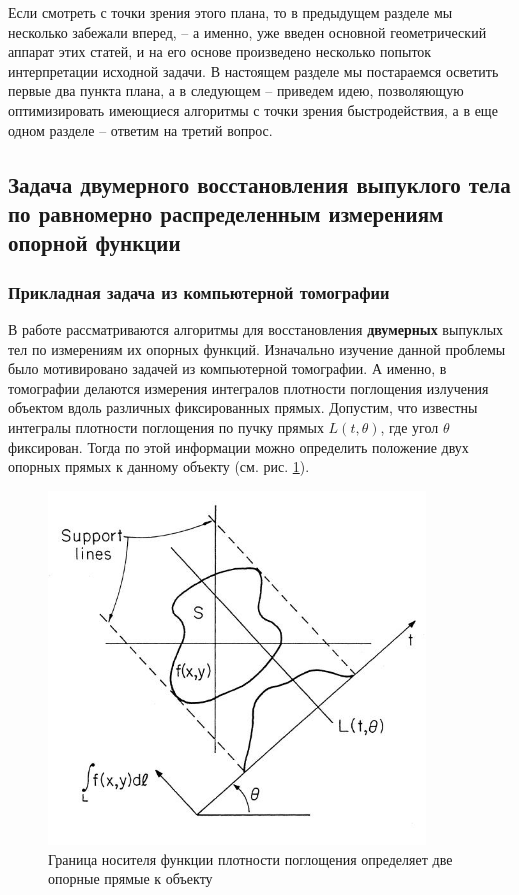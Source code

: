 \documentclass[a4paper, 12pt, titlepage]{article}
\theoremstyle{definition}
\theoremstyle{plain}
\theoremstyle{plain}
\begin{document}
Если смотреть с точки зрения этого плана, то в предыдущем разделе мы несколько
забежали вперед, -- а именно, уже введен основной геометрический аппарат этих
статей, и на его основе произведено несколько попыток интерпретации исходной
задачи. В настоящем разделе мы постараемся осветить первые два пункта плана, а
в следующем -- приведем идею, позволяющую оптимизировать имеющиеся алгоритмы с
точки зрения быстродействия, а в еще одном разделе -- ответим на третий вопрос.

\newpage
\subsection{Задача двумерного восстановления выпуклого тела по равномерно
распределенным измерениям опорной функции}
\label{sec:support-methods:2d-uniform}

\subsubsection{Прикладная задача из компьютерной томографии}
\label{sec:support-methods:2d-uniform:application}

В работе \cite[Prince - Willsky (1990)]{journals/pami/PrinceW90}
рассматриваются алгоритмы для восстановления \textbf{двумерных} выпуклых тел по
измерениям их опорных функций. Изначально изучение данной проблемы было
мотивировано задачей из компьютерной томографии. А именно, в томографии
делаются измерения интегралов плотности поглощения излучения объектом вдоль
различных фиксированных прямых. Допустим, что известны интегралы плотности
поглощения по пучку прямых $L(t, \theta)$, где угол $\theta$ фиксирован. Тогда
по этой информации можно определить положение двух опорных прямых к данному
объекту (см. рис. \ref{tomography-application}).

\begin{figure}[ht]
    \includegraphics[width=10cm]{images/tomography-application.jpg}
    \caption{Граница носителя функции плотности поглощения определяет две
    опорные прямые к объекту}
    \label{tomography-application}
\end{figure}
\end{document}
